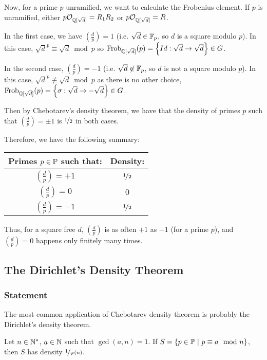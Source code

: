 Now, for a prime $p$ unramified, we want to calculate the Frobenius element.
If $p$ is unramified, either $p \mathcal{O}_{\mathbb{Q}[\sqrt{d}]} = R_1R_2$ or $p \mathcal{O}_{\mathbb{Q}[\sqrt{d}]} = R$.

In the first case, we have $\left( \frac{d}{p} \right) = 1$ (i.e. $\sqrt{d} \in \mathbb{F}_p$, so $d$ is a square modulo $p$).
In this case, $\sqrt{d}^p \equiv \sqrt{d} \bmod p$ so $\text{Frob}_{\mathbb{Q}[\sqrt{d}]}(p) = \left\lbrace Id: \sqrt{d} \to \sqrt{d} \right\rbrace \in G$.

In the second case, $\left( \frac{d}{p} \right) = -1$ (i.e. $\sqrt{d} \not\in \mathbb{F}_p$, so $d$ is not a square modulo $p$).
In this case, $\sqrt{d}^p \not\equiv \sqrt{d} \bmod p$ as there is no other choice, $\text{Frob}_{\mathbb{Q}[\sqrt{d}]}(p) = \left\lbrace \sigma: \sqrt{d} \to -\sqrt{d} \right\rbrace \in G$.

Then by Chebotarev's density theorem, we have that the density of primes $p$ such that $\left( \frac{d}{p} \right) = \pm1$ is $\nicefrac{1}{2}$ in both cases.

Therefore, we have the following summary:
\begin{center}
	\begin{tabular}{|c|c|}
		\hline
		Primes $p \in \mathbb{P}$ such that: & Density:\\
		\hline
		$\left( \frac{d}{p} \right) = +1$ & $\nicefrac{1}{2}$\\
		$\left( \frac{d}{p} \right) =  0$ & $0$\\
		$\left( \frac{d}{p} \right) = -1$ & $\nicefrac{1}{2}$\\
		\hline
	\end{tabular}
\end{center}
Thus, for a square free $d$, $\left( \frac{d}{p} \right)$ is as often $+1$ as $-1$ (for a prime $p$), and  $\left( \frac{d}{p} \right) = 0$ happens only finitely many times.



\subsection{The Dirichlet's Density Theorem}
\subsubsection{Statement}
The most common application of Chebotarev density theorem is probably the Dirichlet's density theorem.
\begin{theorem}
	Let $n \in \mathbb{N}^*$, $a \in \mathbb{N}$ such that $\gcd(a,n) = 1$. 
	If $S = \{ p \in \mathbb{P} \ | \ p \equiv a \mod n \}$, then $S$ has density $\nicefrac{1}{\varphi(n)}$.
\end{theorem}

